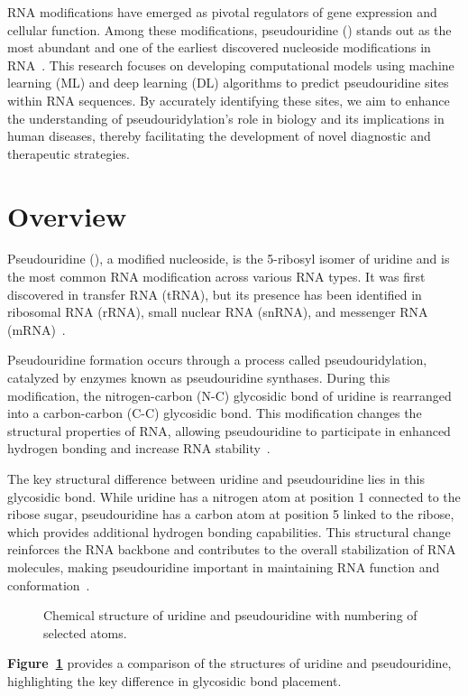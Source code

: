 RNA modifications have emerged as pivotal regulators of gene expression and cellular function.
Among these modifications, pseudouridine (\pseudo) stands out as the most abundant and one of the earliest discovered nucleoside modifications in RNA~\cite{charette_pseudouridine_2000}.
This research focuses on developing computational models using machine learning (ML) and deep learning (DL) algorithms to predict pseudouridine sites within RNA sequences.
By accurately identifying these sites, we aim to enhance the understanding of pseudouridylation's role in biology and its implications in human diseases, thereby facilitating the development of novel diagnostic and therapeutic strategies.


\section{Overview}\label{sec:overview}
  Pseudouridine (\pseudo), a modified nucleoside, is the 5-ribosyl isomer of uridine and is the most common RNA modification across various RNA types.
  It was first discovered in transfer RNA (tRNA), but its presence has been identified in ribosomal RNA (rRNA), small nuclear RNA (snRNA), and messenger RNA (mRNA)~\cite{cohn_nucleoside-5-phosphates_1951}.

  Pseudouridine formation occurs through a process called pseudouridylation, catalyzed by enzymes known as pseudouridine synthases.
  During this modification, the nitrogen-carbon (N-C) glycosidic bond of uridine is rearranged into a carbon-carbon (C-C) glycosidic bond.
  This modification changes the structural properties of RNA, allowing pseudouridine to participate in enhanced hydrogen bonding and increase RNA stability~\cite{charette_pseudouridine_2000}.

  The key structural difference between uridine and pseudouridine lies in this glycosidic bond.
  While uridine has a nitrogen atom at position 1 connected to the ribose sugar, pseudouridine has a carbon atom at position 5 linked to the ribose, which provides additional hydrogen bonding capabilities.
  This structural change reinforces the RNA backbone and contributes to the overall stabilization of RNA molecules, making pseudouridine important in maintaining RNA function and conformation~\cite{ge_rna_2013}.

  \begin{figure}[h!]
    \centering


    \caption{Chemical structure of uridine and pseudouridine with numbering of selected atoms.}
    \label{fig:structure-pseudouridine}
  \end{figure}

  \textbf{Figure~\ref{fig:structure-pseudouridine}} provides a comparison of the structures of uridine and pseudouridine, highlighting the key difference in glycosidic bond placement.
